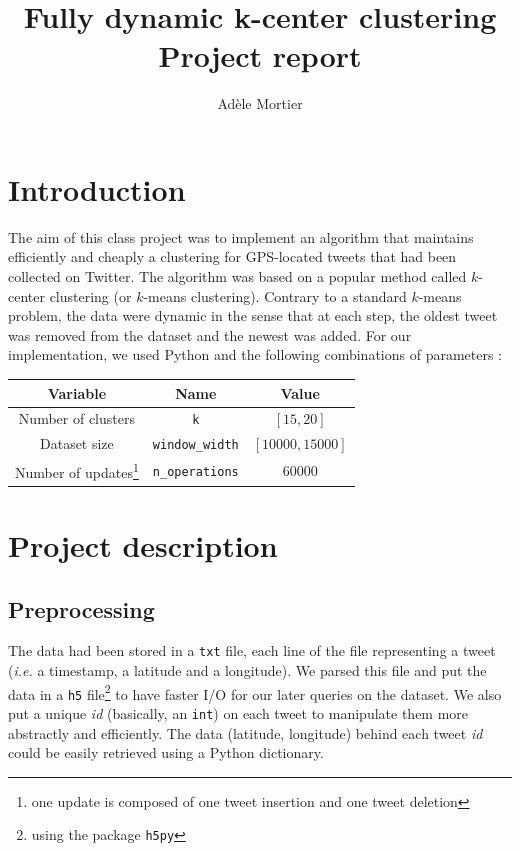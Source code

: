 \documentclass[a4paper,10pt]{article}
\title{Fully dynamic k-center clustering\\
 \vspace{0.3cm}
	\small Project report}
\author{Adèle Mortier}
\begin{document}
\maketitle
\section*{Introduction}
The aim of this class project was to implement an algorithm that maintains efficiently and cheaply a clustering for GPS-located tweets that had been collected on Twitter. The algorithm was based on a popular method called $k$-center clustering (or $k$-means clustering). Contrary to a standard $k$-means problem, the data were dynamic in the sense that at each step, the oldest tweet was removed from the dataset and the newest was added. For our implementation, we used Python and the following combinations of parameters :
\begin{center}
	\begin{tabular}{| c | c | c |}
		\hline
		Variable & Name & Value \\ \hline
		Number of clusters & \texttt{k} & $[15, 20]$ \\
		Dataset size & \texttt{window\_width} & $[10 000, 15 000]$ \\
		Number of updates\footnote{one update is composed of one tweet insertion and one tweet deletion} & \texttt{n\_operations} & $60000$\\
		\hline
	\end{tabular}
\end{center}

\section{Project description}
	\subsection{Preprocessing}
		The data had been stored in a \texttt{txt} file, each line of the file representing a tweet (\textit{i.e.} a timestamp, a latitude and a longitude). We parsed this file and put the data in a \texttt{h5} file\footnote{using the package \texttt{h5py}} to have faster I/O for our later queries on the dataset. We also put a unique \textit{id} (basically, an \texttt{int}) on each tweet to manipulate them more abstractly and efficiently. The data (latitude, longitude) behind each tweet \textit{id} could be easily retrieved using a Python dictionary.
\end{document}
